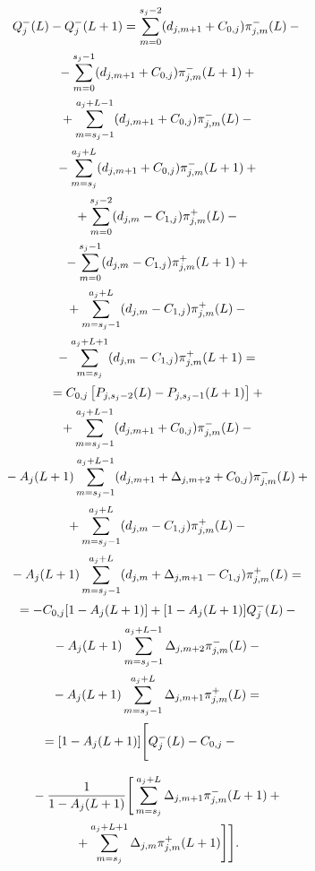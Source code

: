 \begin{multicols}{2}
\noindent
  \begin{multline*}
  Q_j^-(L) -Q_j^-(L+1)=
   \sum\limits_{m=0}^{s_j-2} (d_{j,m+1} +C_{0,j})\pi^-_{j,m}(L)- {}\\[1pt]
   {}-\sum\limits_{m=0}^{s_j-1} (d_{j,m+1}+C_{0,j}) \pi^-_{j,m}(L+1)+{}\\[1pt]
   {}+
  \sum\limits_{m=s_j-1}^{a_j+L-1} (d_{j,m+1} +C_{0,j})\pi^-_{j,m}(L) -{}\\[1pt]
  {}-
\sum\limits_{m=s_j}^{a_j+L} (d_{j,m+1}+C_{0,j})\pi^-_{j,m}(L+1)+{}\\[1pt]
{}+
  \sum\limits_{m=0}^{s_j-2} (d_{j,m}-C_{1,j}) \pi^+_{j,m}(L) -{}
  \\[1pt]
     {}-
\sum\limits_{m=0}^{s_j-1} (d_{j,m}-C_{1,j})\pi^+_{j,m}(L+1)+{}\\[1pt]
    {}+
  \sum\limits^{a_j+L}_{m=s_j-1} (d_{j,m}-C_{1,j})\pi^+_{j,m}(L)- {}\\[1pt]
  {}-
\sum\limits_{m=s_j}^{a_j+L+1} (d_{j,m}-C_{1,j})\pi^+_{j,m}(L+1)={}\\[1pt]
  {}=
  C_{0,j} \left[ P_{j,s_j-2}(L) -P_{j,s_j-1}(L+1)\right] +{}\\[1pt]
  {}+\sum\limits_{m=s_j-1}^{a_j+L-1} (d_{j,m+1} +C_{0,j}) \pi^-_{j,m}(L)-{}\\[1pt]
  {}-
   A_j(L+1) \sum\limits_{m=s_j-1}^{a_j+L-1} (d_{j,m+1} +\Delta_{j,m+2} +C_{0,j})\pi^-_{j,m}(L)+{}\\[1pt]
   {}+
   \sum\limits_{m=s_j-1}^{a_j+L} (d_{j,m} -C_{1,j}) \pi^+_{j,m}(L) -{}\\[1pt]
   {}- A_j(L+1) \sum\limits_{m=s_j-1}^{a_j+L} (d_{j,m}+\Delta_{j,m+1} -C_{1,j})\pi^+_{j,m}(L)={}\\[1pt]
   {}= 
  -C_{0,j} [1-A_j(L+1)] +[1-A_j(L+1)] Q_j^-(L)-{}\\[1pt]
  {}-
  A_j(L+1) \sum\limits_{m=s_j-1}^{a_j+L-1} \Delta_{j,m+2} \pi^-_{j,m}(L) -{}\\[1pt]
  {}-A_j(L+1)  \sum\limits_{m=s_j-1}^{a_j+L} \Delta_{j,m+1} \pi^+_{j,m}(L)={}\\[1pt]
  \hspace*{-10mm}{}= 
  [1-A_j(L+1)] \Bigg[ Q_j^-(L) - C_{0,j} -{}
  \end{multline*}
  
  \noindent
  \begin{multline*}
  {}- \displaystyle\frac{\displaystyle 1\mathstrut}{\displaystyle 1-A_j(L+1)\mathstrut} \Bigg[ 
\sum\limits_{m=s_j}^{a_j+L} \Delta_{j,m+1}\pi^-_{j,m}(L+1)+{}\\
  {}+
  \sum\limits_{m=s_j}^{a_j+L+1} \Delta_{j,m}\pi^+_{j,m}(L+1)\Bigg] \Bigg].
  \end{multline*}
  

\end{multicols}

